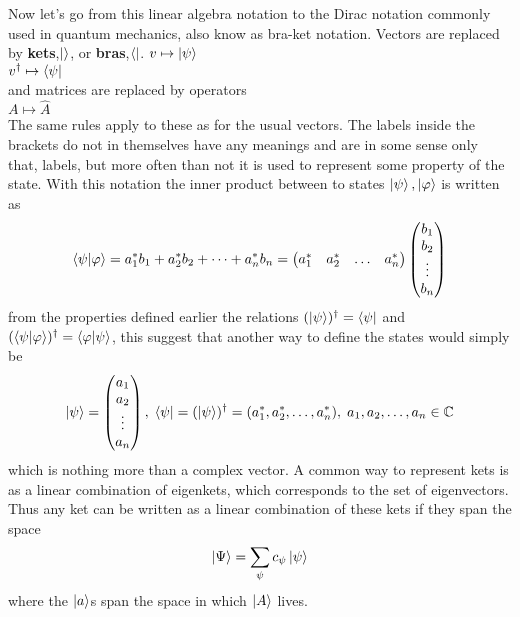 Now let's go from this linear algebra notation to the Dirac notation commonly used in quantum mechanics, also know as bra-ket notation.
Vectors are replaced by \textbf{kets},$\ket{}$, or \textbf{bras},$\bra{}$. 
$v \mapsto \ket{\psi}$ \\
$v^\dagger \mapsto \bra{\psi}$\\
and matrices are replaced by operators\\
$A \mapsto \hat{A}$\\
The same rules apply to these as for the usual vectors.
The labels inside the brackets do not in themselves have any meanings and are in some sense only that, labels, but more often than not it is used to represent some property of the state. With this notation the inner product between to states $\ket{\psi},\ket{\varphi}$ is written as 
\begin{equation}
\bra{\psi}\ket{\varphi} = a_1^{*}b_1 + a_2^{*}b_2 + \dots + a_n^{*}b_n = \begin{pmatrix} a_1^{*} & a_2^{*} & \dots & a_n^{*}\end{pmatrix} \begin{pmatrix} b_1 \\ b_2 \\ \vdots \\ b_n\end{pmatrix}
\end{equation}
from the properties defined earlier the relations $(\ket{\psi})^\dagger = \bra{\psi}$ and $ (\bra{\psi}\ket{\varphi})^\dagger = \bra{\varphi}\ket{\psi}$,
this suggest that another way to define the states would simply be
\begin{equation}
\ket{\psi} = \begin{pmatrix}
a_1 \\ a_2 \\ \vdots \\ a_n
\end{pmatrix},\;
\bra{\psi} = (\ket{\psi})^{\dagger} = (a_1^{*}, a_2^{*}, \dots, a_n^{*}),\; a_1,a_2,\dots,a_n \in \mathbb{C}
\end{equation}
which is nothing more than a complex vector. A common way to represent kets is as a linear combination of eigenkets, which corresponds to the set of eigenvectors. Thus any ket can be written as a linear combination of these kets if they span the space
\begin{equation}
\ket{\Psi} = \sum_{\psi} c_{\psi}\ket{\psi}
\end{equation}
where the $\ket{a}$s span the space in which $\ket{A}$ lives.
